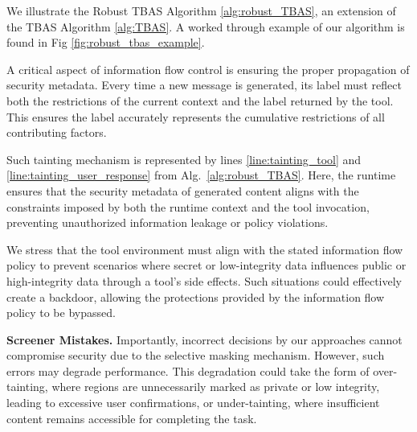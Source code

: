 We illustrate the Robust TBAS Algorithm \ref{alg:robust_TBAS}, an extension of the TBAS Algorithm \ref{alg:TBAS}. A worked through example of our algorithm is found in Fig \ref{fig:robust_tbas_example}.

A critical aspect of information flow control is ensuring the proper propagation of security metadata. Every time a new message is generated, its label must reflect both the restrictions of the current context and the label returned by the tool. This ensures the label accurately represents the cumulative restrictions of all contributing factors.  

Such tainting mechanism is represented by lines \ref{line:tainting_tool} and \ref{line:tainting_user_response} from Alg.~\ref{alg:robust_TBAS}. Here, the runtime ensures that the security metadata of generated content aligns with the constraints imposed by both the runtime context and the tool invocation, preventing unauthorized information leakage or policy violations.

We stress that the tool environment must align with the stated information flow policy to prevent scenarios where secret or low-integrity data influences public or high-integrity data through a tool’s side effects. Such situations could effectively create a backdoor, allowing the protections provided by the information flow policy to be bypassed. 

\textbf{Screener Mistakes.}
Importantly, incorrect decisions by our \dependencydetector approaches cannot compromise security due to the selective masking mechanism. However, such errors may degrade performance. This degradation could take the form of over-tainting, where regions are unnecessarily marked as private or low integrity, leading to excessive user confirmations, or under-tainting, where insufficient content remains accessible for completing the task. 

